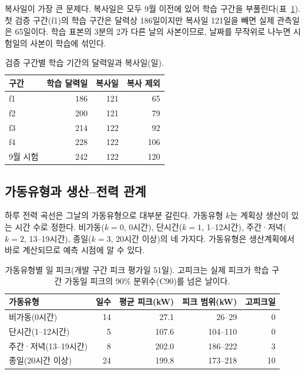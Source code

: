 복사일이 가장 큰 문제다. 복사일은 모두 9월 이전에 있어 학습 구간을 부풀린다(표~\ref{tab:ch3-copies}). 첫 검증 구간(f1)의 학습 구간은 달력상 186일이지만 복사일 121일을 빼면 실제 관측일은 65일이다. 학습 표본의 3분의 2가 다른 날의 사본이므로, 날짜를 무작위로 나누면 시험일의 사본이 학습에 섞인다.

\begin{table}[h]
\centering
\caption{검증 구간별 학습 기간의 달력일과 복사일(일).}
\label{tab:ch3-copies}
\begin{tabular}{lrrr}
\toprule
구간 & 학습 달력일 & 복사일 & 복사 제외 \\
\midrule
f1 & 186 & 121 & 65 \\
f2 & 200 & 121 & 79 \\
f3 & 214 & 122 & 92 \\
f4 & 228 & 122 & 106 \\
9월 시험 & 242 & 122 & 120 \\
\bottomrule
\end{tabular}
\end{table}

\subsection{가동유형과 생산--전력 관계}

하루 전력 곡선은 그날의 가동유형으로 대부분 갈린다. 가동유형 $k$는 계획상 생산이 있는 시간 수로 정한다. 비가동($k=0$, 0시간), 단시간($k=1$, 1--12시간), 주간·저녁($k=2$, 13--19시간), 종일($k=3$, 20시간 이상)의 네 가지다. 가동유형은 생산계획에서 바로 계산되므로 예측 시점에 알 수 있다.

\begin{table}[h]
\centering
\caption{가동유형별 일 피크(개발 구간 피크 평가일 51일). 고피크는 실제 피크가 학습 구간 가동일 피크의 90\% 분위수(C90)를 넘은 날이다.}
\label{tab:ch3-kind}
\begin{tabular}{lrrrr}
\toprule
가동유형 & 일수 & 평균 피크(kW) & 피크 범위(kW) & 고피크일 \\
\midrule
비가동(0시간) & 14 & 27.1 & 26--29 & 0 \\
단시간(1--12시간) & 5 & 107.6 & 104--110 & 0 \\
주간·저녁(13--19시간) & 8 & 202.0 & 186--222 & 3 \\
종일(20시간 이상) & 24 & 199.8 & 173--218 & 10 \\
\bottomrule
\end{tabular}
\end{table}

